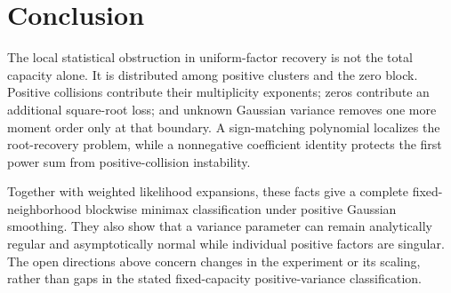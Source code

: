 \documentclass[11pt,a4paper]{article}
\numberwithin{equation}{section}
\theoremstyle{definition}
\theoremstyle{remark}
\begin{document}
\section{Conclusion}
The local statistical obstruction in uniform-factor recovery is not the total
capacity alone. It is distributed among positive clusters and the zero block.
Positive collisions contribute their multiplicity exponents; zeros contribute
an additional square-root loss; and unknown Gaussian variance removes one
more moment order only at that boundary. A sign-matching polynomial localizes
the root-recovery problem, while a nonnegative coefficient identity protects
the first power sum from positive-collision instability.

Together with weighted likelihood expansions, these facts give a complete
fixed-neighborhood blockwise minimax classification under positive Gaussian
smoothing. They also show that a variance parameter can remain analytically
regular and asymptotically normal while individual positive factors are
singular. The open directions above concern changes in the experiment or its
scaling, rather than gaps in the stated fixed-capacity positive-variance
classification.
\end{document}
